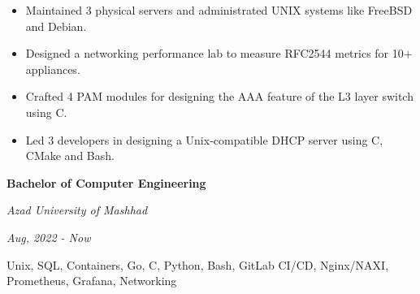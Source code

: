\documentclass{engineercv}
\begin{document}
\begin{itemize}
  \item Maintained 3 physical servers and administrated UNIX systems like FreeBSD and Debian.
  \item Designed a networking performance lab to measure RFC2544 metrics for 10+ appliances.
  \item Crafted 4 PAM modules for designing the AAA feature of the L3 layer switch using C.
  \item Led 3 developers in designing a Unix-compatible DHCP server using C, CMake and Bash.
\end{itemize}

\begin{minipage}{\textwidth}
\begin{multicols}{2}
  \begin{minipage}{0.5\textwidth}
    \textbf{Bachelor of Computer Engineering}
    
    \textit{Azad University of Mashhad}
    
    \textit{Aug, 2022 - Now}
  \end{minipage}
  \columnbreak
  \begin{minipage}{0.5\textwidth}
      Unix, SQL, Containers, Go, C, Python, Bash, GitLab CI/CD,
      Nginx/NAXI, Prometheus, Grafana, Networking
  \end{minipage}
\end{multicols}
\end{minipage}
\end{document}

